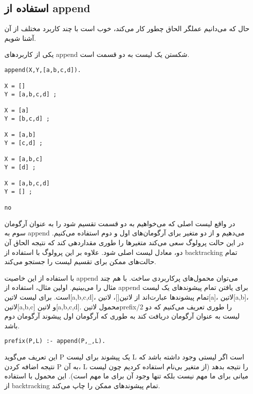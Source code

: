 \subsection{استفاده از append}

حال که می‌دانیم عملگر الحاق چطور کار می‌کند، خوب است با چند کاربرد مختلف از آن آشنا شویم.

یکی از کاربردهای append شکستن یک لیست به دو قسمت است.

\begin{latin}
\begin{lstlisting}
append(X,Y,[a,b,c,d]).

X = []
Y = [a,b,c,d] ;

X = [a]
Y = [b,c,d] ;

X = [a,b]
Y = [c,d] ;

X = [a,b,c]
Y = [d] ;

X = [a,b,c,d]
Y = [] ;

no
\end{lstlisting}
\end{latin}

در واقع لیست اصلی که می‌خواهیم به دو قسمت تقسیم شود را به عنوان آرگومان سوم به append می‌دهیم و از دو متغیر برای آرگومان‌های اول و دوم استفاده می‌کنیم. در این حالت پرولوگ سعی می‌کند متغیرها را طوری مقداردهی کند که نتیجه الحاق آن دو، معادل لیست اصلی شود. علاوه بر این پرولوگ با استفاده از backtracking تمام حالت‌های ممکن برای تقسیم لیست را جستجو می‌کند.

با استفاده از این خاصیت append می‌توان محمول‌های پرکاربردی ساخت. با هم چند مثال را می‌بینیم. اولین مثال، استفاده از append برای یافتن تمام پیشوندهای یک لیست است. برای لیست ‌لاتین{[a,b,c,d]}، تمام پیشوندها عبارت‌اند از ‌لاتین{[]}، ‌لاتین{[a]}، ‌لاتین{[a,b]}، ‌لاتین{[a,b,c]} و ‌لاتین{[a,b,c,d]}. محمول ‌لاتین{prefix/2} را طوری تعریف می‌کنیم که دو لیست به عنوان آرگومان دریافت کند  به طوری که آرگومان اول پیشوند آرگومان دوم باشد.

\begin{latin}
\begin{lstlisting}
prefix(P,L) :- append(P,_,L).
\end{lstlisting}
\end{latin}

این تعریف می‌گوید P یک پیشوند برای لیست L است اگر لیستی وجود داشته باشد که نتیجه اضافه کردن P به آن، L را نتیجه بدهد (از متغیر بی‌نام استفاده کردیم چون لیست میانی برای ما مهم نیست بلکه تنها وجود آن برای ما مهم است). این محمول با استفاده از backtracking تمام پیشوندهای ممکن را چاپ می‌کند.

